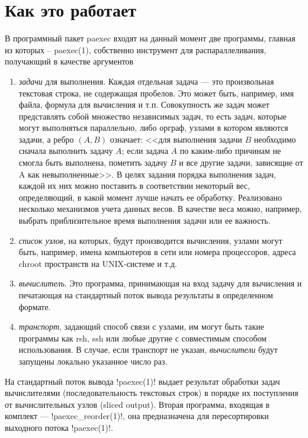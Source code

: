 \documentclass[10pt, a5paper]{article}
\begin{document}
\section*{Как это работает}
В программный пакет paexec входят на данный момент
две программы, главная из которых -- paexec(1), собственно инструмент для
распараллеливания, получающий в качестве аргументов
\begin{enumerate}
\item \emph{задачи} для выполнения. Каждая отдельная задача --- это
   произвольная текстовая строка, не содержащая пробелов. Это может
   быть, например, имя файла, формула для вычисления и
   т.п. Совокупность же задач может представлять собой множество
   независимых задач, то есть задач, которые могут выполняться
   параллельно, либо орграф, узлами в котором являются задачи, а ребро
   $(A, B)$ означает: <<для выполнения задачи $B$ необходимо сначала
   выполнить задачу $A$; если задача $A$ по каким-либо причинам не смогла
   быть выполнена, пометить задачу $B$ и все другие задачи, зависящие от
   A как невыполненные>>. В целях задания порядка выполнения задач,
   каждой их них можно поставить в соответствии некоторый вес,
   определяющий, в какой момент лучше начать ее обработку. Реализовано
   несколько механизмов учета данных весов. В качестве веса можно,
   например, выбрать приблизительное время выполнения задачи или ее
   важность.
\item \emph{список узлов}, на которых, будут производится вычисления, узлами
   могут быть, например, имена компьютеров в сети или номера процессоров,
   адреса chroot пространств на UNIX-системе и т.д.
\item \emph{вычислитель}. Это программа, принимающая на вход задачу для
   вычисления и печатающая на стандартный поток вывода результаты в
   определенном формате.
\item \emph{транспорт}, задающий способ связи с узлами, им могут быть такие
   программы как rsh, ssh или любые другие с совместимым способом
   использования. В случае, если транспорт не указан, \emph{вычислители}
   будут запущены локально указанное число раз.
\end{enumerate}

На стандартный поток вывода \progref!paexec(1)! выдает результат обработки задач
вычислителями (последовательность текстовых строк) в порядке их
поступления от вычислительных узлов (sliced output). Вторая программа,
входящая в комплект --- \progref!paexec\_re\-order(1)!, она предназначена для
пересортировки выходного потока \progref!paexec(1)!.
\end{document}
